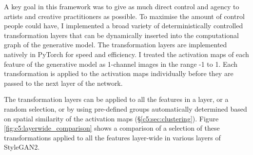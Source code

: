 \label{c5:sec:transforms}

A key goal in this framework was to give as much direct control and agency to artists and creative practitioners as possible.
To maximise the amount of control people could have, I implemented a broad variety of deterministically controlled transformation layers that can be dynamically inserted into the computational graph of the generative model. 
The transformation layers are implemented natively in PyTorch \citep{paszke2019pytorch} for speed and efficiency. I
 treated the activation maps of each feature of the generative model as 1-channel images in the range -1 to 1. 
 Each transformation is applied to the activation maps individually before they are passed to the next layer of the network. 

 The transformation layers can be applied to all the features in a layer, or a random selection, or by using pre-defined groups automatically determined based on spatial similarity of the activation maps (\S \ref{c5:sec:clustering}). 
 Figure \ref{fig:c5:layerwide_comparison} shows a comparison of a selection of these transformations applied to all the features layer-wide in various layers of StyleGAN2.

